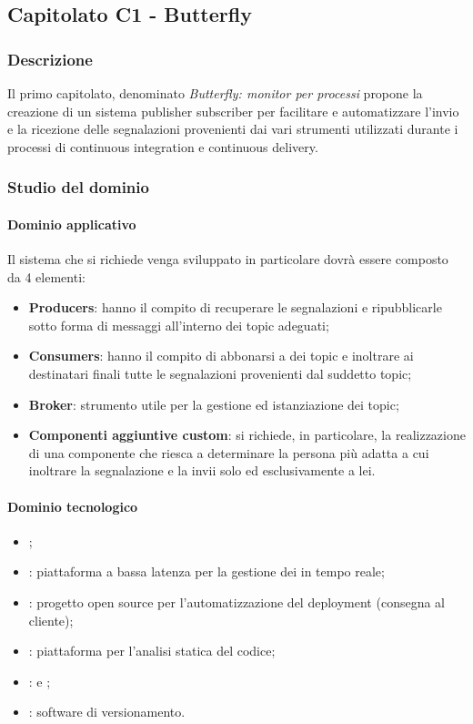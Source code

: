 	\subsection{Capitolato C1 - Butterfly}
		\subsubsection{Descrizione}
	    Il primo capitolato, denominato \emph{Butterfly: monitor per processi } propone la creazione di un sistema publisher subscriber per facilitare e automatizzare l'invio e la ricezione delle segnalazioni provenienti dai vari strumenti utilizzati durante i processi di continuous integration e continuous delivery.
		\subsubsection{Studio del dominio}
			\paragraph{Dominio applicativo} \Spazio
			Il sistema che si richiede venga sviluppato in particolare dovrà essere composto da 4 elementi:
			\begin{itemize}	 
\item \textbf{{Producers}}: hanno il compito di recuperare le segnalazioni e ripubblicarle sotto forma di messaggi all'interno dei
topic adeguati;
\item \textbf{{Consumers}}: hanno il compito di abbonarsi a dei topic e inoltrare ai destinatari finali tutte le segnalazioni
provenienti dal suddetto topic;
\item \textbf{{Broker}}: strumento utile per la gestione ed istanziazione dei topic;
\item \textbf{{Componenti aggiuntive custom}}: si richiede, in particolare, la realizzazione di una componente che riesca a determinare la persona più adatta a cui inoltrare la segnalazione e la invii solo ed esclusivamente a lei.
			\end{itemize}
			\paragraph{Dominio tecnologico}
			\begin{itemize}
				\item \textbf{}; 
				\item  \textbf{}: piattaforma a bassa latenza per la gestione dei  in tempo reale;
				\item  \textbf{}: progetto open source per l'automatizzazione del deployment (consegna al cliente);
				\item  \textbf{}: piattaforma per l'analisi statica del codice;
				\item  \textbf{}:  e ;
				\item  \textbf{}: software di versionamento.
			\end{itemize}
			
